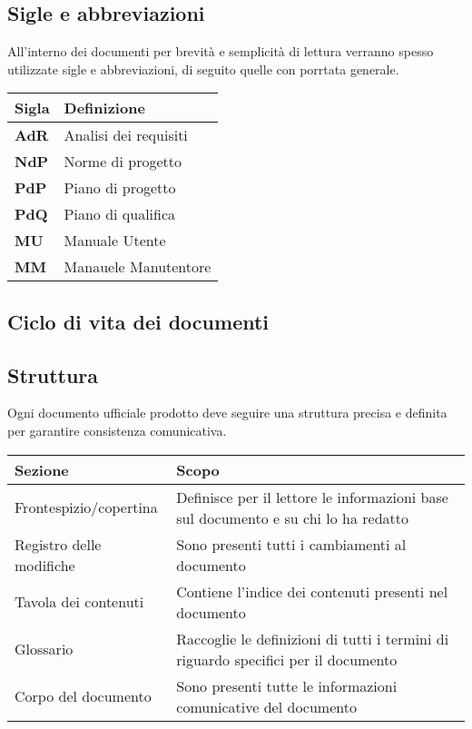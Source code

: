 \subsection{Sigle e abbreviazioni}

All'interno dei documenti per brevità e semplicità di lettura verranno spesso utilizzate sigle e abbreviazioni, di seguito quelle con porrtata generale.

\begin{center}
    \begin{tabularx}{\linewidth}{l | X }            
        \textbf{Sigla} & \textbf{Definizione}\\
        \hline
        \textbf{AdR} & Analisi dei requisiti\\
        \textbf{NdP}& Norme di progetto\\
        \textbf{PdP}& Piano di progetto\\
        \textbf{PdQ}& Piano di qualifica\\
        \textbf{MU}& Manuale Utente\\
        \textbf{MM}& Manauele Manutentore\\
    \end{tabularx}
\end{center}

\subsection{Ciclo di vita dei documenti}

\subsection{Struttura}

Ogni documento ufficiale prodotto deve seguire una struttura precisa e definita per garantire consistenza comunicativa.

\begin{center}
    \begin{tabularx}{\linewidth}{l | X }            
        \textbf{Sezione} & \textbf{Scopo}\\
        \hline
        Frontespizio/copertina & Definisce per il lettore le informazioni base sul documento e su chi lo ha redatto\\
        Registro delle modifiche & Sono presenti tutti i cambiamenti al documento\\
        Tavola dei contenuti & Contiene l'indice dei contenuti presenti nel documento \\
        Glossario & Raccoglie le definizioni di tutti i termini di riguardo specifici per il documento\\
        Corpo del documento & Sono presenti tutte le informazioni comunicative del documento\\
    \end{tabularx}
\end{center}

